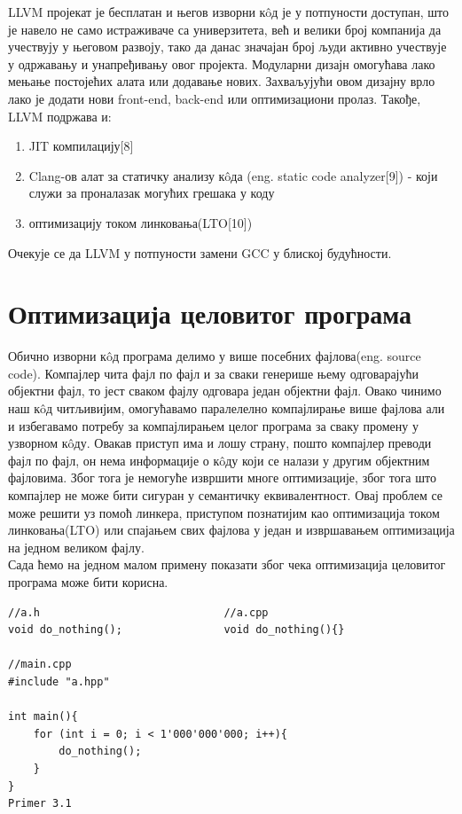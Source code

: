\documentclass[12pt,oneside]{memoir}
\begin{document}
LLVM пројекат је бесплатан и његов изворни к\^{o}д је у потпуности доступан, 
што је навело не само истраживаче са универзитета, већ и велики број компанија 
да учествују у његовом развоју, тако да данас значајан број људи активно 
учествује у одржавању и унапређивању овог пројекта.
Модуларни дизајн омогућава лако мењање постојећих алата или додавање нових.
Захваљујући овом дизајну врло лако је додати нови front-end, back-end или
оптимизациони пролаз.
Такође, LLVM подржава и:
\begin{enumerate}
\item JIT компилацију[8]
\item Clang-ов алат за статичку анализу к\^{o}да (eng. static code analyzer[9]) 
- који служи за  проналазак могућих грешака у коду
\item оптимизацију током линковања(LTO[10])
\end{enumerate}
 Очекује се да LLVM у потпуности замени GCC у блиској будућности.

\chapter{Оптимизација целовитог програма}

Обично изворни к\^{o}д програма делимо у више посебних фајлова(eng. source code).
Компајлер чита фајл по фајл и за сваки генерише њему одговарајући објектни фајл,
то јест сваком фајлу одговара један објектни фајл.
Овако чинимо наш к\^{o}д читљивијим, омогућавамо паралелелно компајлирање више 
фајлова али и избегавамо потребу за компајлирањем целог програма за сваку промену
у узворном к\^{o}ду.
Овакав приступ има и лошу страну, пошто компајлер преводи фајл по фајл, он нема 
информације о к\^{o}ду који се налази у другим објектним фајловима.
Због тога је немогуће извршити многе оптимизације, због тога што компајлер не може 
бити сигуран у семантичку еквивалентност.
Овај проблем се може решити уз помоћ линкера, приступом познатијим као 
оптимизација током линковања(LTO) или спајањем свих фајлова у један и извршавањем
оптимизација на једном великом фајлу.
\\
Сада ћемо на једном малом примену показати због чека оптимизација целовитог програма 
може бити корисна.

\begin{lstlisting}
//a.h                             //a.cpp
void do_nothing();                void do_nothing(){} 

//main.cpp          
#include "a.hpp"

int main(){
    for (int i = 0; i < 1'000'000'000; i++){
        do_nothing();
    }
}
Primer 3.1
\end{lstlisting}
\end{document}
